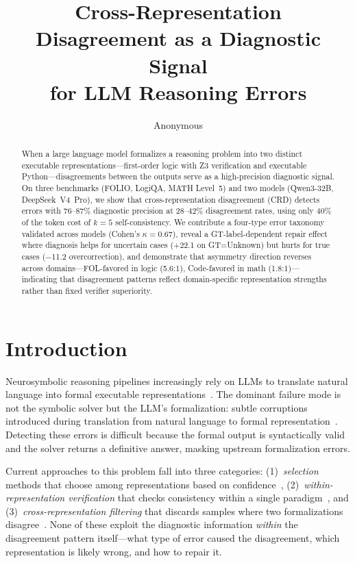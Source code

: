 \documentclass[11pt,a4paper]{article}
\title{Cross-Representation Disagreement as a Diagnostic Signal\\for LLM Reasoning Errors}
\author{Anonymous}
\newcommand{\pp}{\text{pp}}
\begin{document}
\maketitle

\begin{abstract}
When a large language model formalizes a reasoning problem into two distinct executable representations---first-order logic with Z3 verification and executable Python---disagreements between the outputs serve as a high-precision diagnostic signal. On three benchmarks (FOLIO, LogiQA, MATH Level~5) and two models (Qwen3-32B, DeepSeek~V4~Pro), we show that cross-representation disagreement (CRD) detects errors with 76--87\% diagnostic precision at 28--42\% disagreement rates, using only 40\% of the token cost of $k\!=\!5$ self-consistency. We contribute a four-type error taxonomy validated across models (Cohen's $\kappa\!=\!0.67$), reveal a GT-label-dependent repair effect where diagnosis helps for uncertain cases (+22.1\pp{} on GT=Unknown) but hurts for true cases ($-$11.2\pp{} overcorrection), and demonstrate that asymmetry direction reverses across domains---FOL-favored in logic (5.6:1), Code-favored in math (1.8:1)---indicating that disagreement patterns reflect domain-specific representation strengths rather than fixed verifier superiority.
\end{abstract}

\section{Introduction}

Neurosymbolic reasoning pipelines increasingly rely on LLMs to translate natural language into formal executable representations~\cite{pan2023logiclm,ye2024satlm}. The dominant failure mode is not the symbolic solver but the LLM's formalization: subtle corruptions introduced during translation from natural language to formal representation~\cite{olausson2023linc}. Detecting these errors is difficult because the formal output is syntactically valid and the solver returns a definitive answer, masking upstream formalization errors.

Current approaches to this problem fall into three categories: (1)~\emph{selection} methods that choose among representations based on confidence~\cite{li2024hybridmind,sun2024adaptive}, (2)~\emph{within-representation verification} that checks consistency within a single paradigm~\cite{weng2023vericot,kang2025verge,zhong2025roundtrip}, and (3)~\emph{cross-representation filtering} that discards samples where two formalizations disagree~\cite{liang2024cotpot,prove2024}. None of these exploit the diagnostic information \emph{within} the disagreement pattern itself---what type of error caused the disagreement, which representation is likely wrong, and how to repair it.
\end{document}
